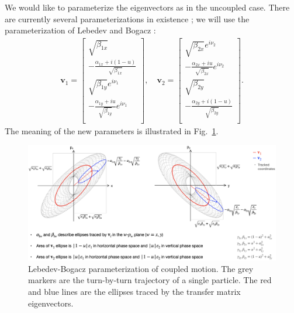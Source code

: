 We would like to parameterize the eigenvectors as in the uncoupled case. There are currently several parameterizations in existence \cite{Edwards1973, Ripken1989, Wolski2006, Lebedev2010, Qin2009}; we will use the parameterization of Lebedev and Bogacz \cite{Lebedev2010}:
%
\begingroup
\renewcommand*{\arraystretch}{1.5}
\begin{equation}
\begin{aligned}
    \mathbf{v}_1 = 
    \begin{bmatrix}
        \sqrt{\beta_{1x}} \\
        -\frac{\alpha_{1x} + i(1-u)}{\sqrt{\beta_{1x}}} \\
        \sqrt{\beta_{1y}}e^{i\nu_1} \\
        -\frac{\alpha_{1y} + iu}{\sqrt{\beta_{1y}}} e^{i\nu_1} \\
    \end{bmatrix} ,\quad
    \mathbf{v}_2 = 
    \begin{bmatrix}
        \sqrt{\beta_{2x}}e^{i\nu_2} \\
        -\frac{\alpha_{2x} + iu}{\sqrt{\beta_{2x}}}e^{i\nu_2} \\
        \sqrt{\beta_{2y}} \\
        -\frac{\alpha_{2y} + i(1-u)}{\sqrt{\beta_{2y}}} \\
    \end{bmatrix}.
\end{aligned}
\end{equation}
\endgroup
%
The meaning of the new parameters is illustrated in Fig.~\ref{fig:twiss4D}.
%
\begin{figure}[!p]
    \centering
    \includegraphics[width=\textwidth]{Images/chapter1/twiss4D.png}
    \vspace*{0.1cm}
    \caption{Lebedev-Bogacz parameterization of coupled motion. The grey markers are the turn-by-turn trajectory of a single particle. The red and blue lines are the ellipses traced by the transfer matrix eigenvectors.}
    \label{fig:twiss4D}
\end{figure}
